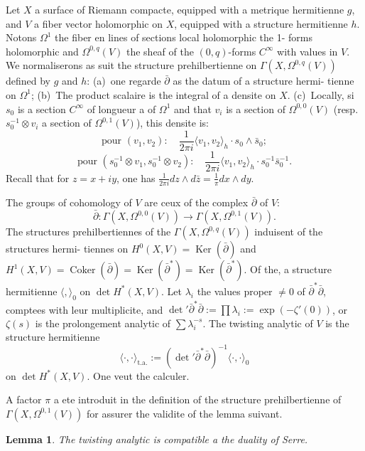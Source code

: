 \documentclass[12pt,a4paper]{article}
\theoremstyle{plain}
\newtheorem{lemma}[theorem]{Lemma}
\theoremstyle{definition}
\DeclareMathOperator{\Ker}{Ker}
\DeclareMathOperator{\Coker}{Coker}
\begin{document}
Let $X$ a surface of Riemann compacte, equipped with a metrique hermitienne
$g$, and $V$ a fiber vector holomorphic on $X$, equipped with a structure hermitienne
$h$. Notons $\Omega^1$ the fiber en lines of sections local holomorphic the 1-
forms holomorphic and $\Omega^{0,q}(V)$ the sheaf of the $(0,q)$-forms $C^\infty$ with values in
$V$. We normaliserons as suit the structure prehilbertienne on $\Gamma(X, \Omega^{0,q}(V))$
defined by $g$ and $h$: (a)~one regarde $\bar\partial$ as the datum of a structure hermi-
tienne on $\Omega^1$; (b)~The product scalaire is the integral of a densite on $X$.
(c)~Locally, si $s_0$ is a section $C^\infty$ of longueur a of $\Omega^1$ and that $v_i$ is
a section of $\Omega^{0,0}(V)$ (resp.\ $s_0^{-1} \otimes v_i$ a section of $\Omega^{0,1}(V)$), this densite
is:
\[
\text{pour } (v_1, v_2): \quad \frac{1}{2\pi i} \langle v_1, v_2 \rangle_h \cdot s_0 \wedge \bar s_0 ;
\]
\[
\text{pour } (s_0^{-1} \otimes v_1, s_0^{-1} \otimes v_2): \quad \frac{1}{2\pi i} \langle v_1, v_2 \rangle_h \cdot s_0^{-1} \bar s_0^{-1} .
\]
Recall that for $z = x + iy$, one has $\frac{1}{2\pi i} dz \wedge d\bar z = \frac{1}{\pi} dx \wedge dy$.

The groups of cohomology of $V$ are ceux of the complex $\bar\partial$ of $V$:
\[
\bar\partial: \Gamma(X, \Omega^{0,0}(V)) \longrightarrow \Gamma(X, \Omega^{0,1}(V)) .
\]
The structures prehilbertiennes of the $\Gamma(X, \Omega^{0,q}(V))$ induisent of the structures hermi-
tiennes on $H^0(X,V) = \Ker(\bar\partial)$ and $H^1(X,V) = \Coker(\bar\partial) = \Ker(\bar\partial^*) = \Ker(\bar\partial^*)$. Of the,
a structure hermitienne $\langle , \rangle_0$ on $\det H^*(X,V)$. Let $\lambda_i$ the values
proper $\neq 0$ of $\bar\partial^*\bar\partial$, comptees with leur multiplicite, and $\det' \bar\partial^*\bar\partial := \prod \lambda_i :=
\exp(-\zeta'(0))$, or $\zeta(s)$ is the prolongement analytic of $\sum \lambda_i^{-s}$. The twisting
analytic of $V$ is the structure hermitienne
\[
\langle \cdot, \cdot \rangle_{\text{t.a.}} := (\det' \bar\partial^*\bar\partial)^{-1} \langle \cdot, \cdot \rangle_0
\]
on $\det H^*(X,V)$. One veut the calculer.

A factor $\pi$ a ete introduit in the definition of the structure prehilbertienne
of $\Gamma(X, \Omega^{0,1}(V))$ for assurer the validite of the lemma suivant.

\begin{lemma}
The twisting analytic is compatible a the duality of Serre.
\end{lemma}
\end{document}
